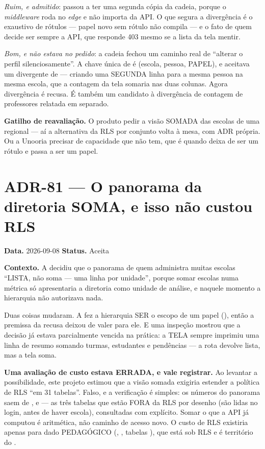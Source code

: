 \emph{Ruim, e admitido}:  passou a ter uma segunda
cópia da cadeia, porque o \emph{middleware} roda no \emph{edge} e não importa da
API. O que segura a divergência é o  exaustivo de rótulos --- papel
novo sem rótulo não compila --- e o fato de quem decide ser sempre a API, que
responde 403 mesmo se a lista da tela mentir.

\emph{Bom, e não estava no pedido}: a cadeia fechou um caminho real de
\enquote{alterar o perfil silenciosamente}. A chave única de  é
(escola, pessoa, PAPEL), e  aceitava um  divergente de
 --- criando uma SEGUNDA linha para a mesma pessoa na mesma
escola, que a contagem da tela somaria nas duas colunas. Agora divergência é
recusa. É também um candidato à divergência de contagem de professores relatada
em separado.

\textbf{Gatilho de reavaliação.} O produto pedir a visão SOMADA das escolas de
uma regional --- aí a alternativa da RLS por conjunto volta à mesa, com ADR
própria. Ou a Unooria precisar de capacidade que  não tem,
que é quando  deixa de ser um rótulo e passa a ser um papel.

\section{ADR-81 --- O panorama da diretoria SOMA, e isso não custou RLS}
\label{adr:panorama-da-regional}

\textbf{Data.} 2026-09-08 \quad \textbf{Status.} Aceita

\textbf{Contexto.} A  decidiu que o panorama de quem administra
muitas escolas \enquote{LISTA, não soma --- uma linha por unidade}, porque somar
escolas numa métrica só apresentaria a diretoria como unidade de análise, e
naquele momento a hierarquia não autorizava nada.

Duas coisas mudaram. A  fez a hierarquia SER o escopo de um papel
(), então a premissa da recusa deixou de valer para ele. E
uma inspeção mostrou que a decisão já estava parcialmente vencida na prática: a
TELA  sempre imprimiu uma linha de resumo somando
turmas, estudantes e pendências --- a rota devolve lista, mas a tela soma.

\textbf{Uma avaliação de custo estava ERRADA, e vale registrar.} Ao levantar a
possibilidade, este projeto estimou que a visão somada exigiria estender a
política de RLS \enquote{em 31 tabelas}. Falso, e a verificação é simples: os
números do panorama saem de ,  e  --- as três
tabelas que estão FORA da RLS por desenho (são lidas no login, antes de haver
escola), consultadas com  explícito. Somar o que a API já
computou é aritmética, não caminho de acesso novo. O custo de RLS existiria
apenas para dado PEDAGÓGICO (, , tabelas ), que
está sob RLS e é território do .

